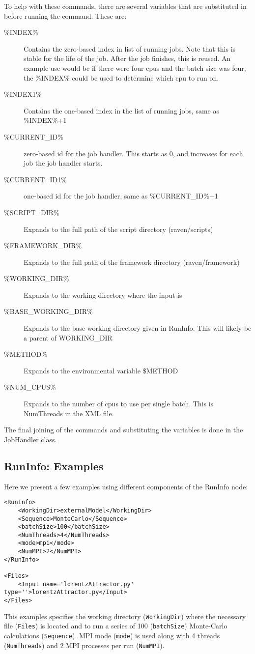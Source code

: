 To help with these commands, there are several variables that are
substituted in before running the command.  These are:

\begin{description}
\item[\%INDEX\%]  Contains the zero-based index in list of running jobs.  Note that this is stable for the life of the job.  After the job finishes, this is reused.  An example use would be if there were four cpus and the batch size was four, the \%INDEX\% could be used to determine which cpu to run on.
\item[\%INDEX1\%] Contains the one-based index in the list of running jobs, same as \%INDEX\%+1
\item[\%CURRENT\_ID\%]  zero-based id for the job handler.  This starts as 0, and increases for each job the job handler starts.
\item[\%CURRENT\_ID1\%] one-based id for the job handler, same as \%CURRENT\_ID\%+1
\item[\%SCRIPT\_DIR\%] Expands to the full path of the script directory (raven/scripts)
\item[\%FRAMEWORK\_DIR\%]  Expands to the full path of the framework directory (raven/framework)
\item[\%WORKING\_DIR\%]  Expands to the working directory where the input is
\item[\%BASE\_WORKING\_DIR\%]  Expands to the base working directory given in RunInfo.  This will likely be a parent of WORKING\_DIR
\item[\%METHOD\%]  Expands to the environmental variable \$METHOD
\item[\%NUM\_CPUS\%]  Expands to the number of cpus to use per single batch.  This is NumThreads in the XML file.

\end{description}

The final joining of the commands and substituting the variables is
done in the JobHandler class.

\subsection{RunInfo: Examples}
\label{subsec:runinfoexamples}
Here we present a few examples using different components of the RunInfo node:
\begin{lstlisting}[style=XML]
<RunInfo>
    <WorkingDir>externalModel</WorkingDir>
    <Sequence>MonteCarlo</Sequence>
    <batchSize>100</batchSize>
    <NumThreads>4</NumThreads>
    <mode>mpi</mode>
    <NumMPI>2</NumMPI>
</RunInfo>

<Files>
    <Input name='lorentzAttractor.py' type=''>lorentzAttractor.py</Input>
</Files>
\end{lstlisting}
This examples specifies the working directory (\texttt{WorkingDir}) where the
necessary file (\texttt{Files}) is located and to run a series of 100
(\texttt{batchSize}) Monte-Carlo calculations (\texttt{Sequence}).
%
MPI mode (\texttt{mode}) is used along with 4 threads (\texttt{NumThreads}) and
2 MPI processes per run (\texttt{NumMPI}).
